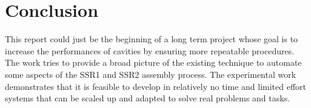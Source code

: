 \documentclass[12pt,a4paper]{article}
\begin{document}







\clearpage
\newpage


\section{Conclusion}
This report could just be the beginning of a long term project whose goal is to increase the performances of cavities by ensuring more repeatable procedures. The work tries to provide a broad picture of the existing technique to automate some aspects of the SSR1 and SSR2 assembly process. 
\newline
The experimental work demonstrates that it is feasible to develop in relatively no time and limited effort systems that can be scaled up and adapted to solve real problems and tasks.
\end{document}
